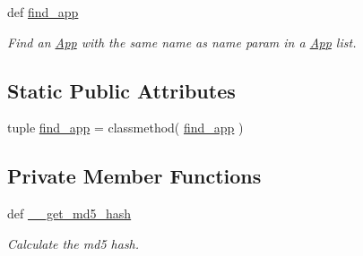 \begin{CompactItemize}
def \hyperlink{classwinsollib_1_1App_dc394b817be76e77e60d01a4dd20649d}{find\_\-app}
\begin{CompactList}\small\item\em Find an \hyperlink{classwinsollib_1_1App}{App} with the same name as {\em name\/} param in a \hyperlink{classwinsollib_1_1App}{App} list. \item\end{CompactList}\end{CompactItemize}
\subsection*{Static Public Attributes}
\begin{CompactItemize}
\item 
tuple \hyperlink{classwinsollib_1_1App_8781b002b53dc32d0d780fa72069def8}{find\_\-app} = classmethod( \hyperlink{classwinsollib_1_1App_8781b002b53dc32d0d780fa72069def8}{find\_\-app} )
\end{CompactItemize}
\subsection*{Private Member Functions}
\begin{CompactItemize}
\item 
def \hyperlink{classwinsollib_1_1App_ec84db2c67a7f820bb57cda445d417b2}{\_\-\_\-get\_\-md5\_\-hash}
\begin{CompactList}\small\item\em Calculate the md5 hash. \item\end{CompactList}\end{CompactItemize}
